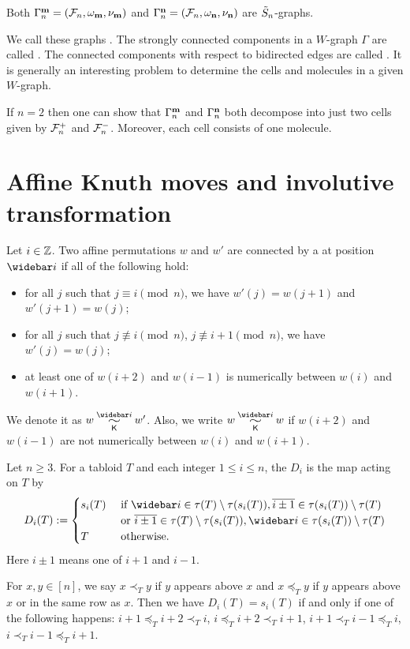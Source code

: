 \documentclass[11pt]{article}
\begin{document}
\begin{corollary}
Both $\Gamma^{\mathbf{m}}_n=(\mathcal F_n,\omega_{\mathbf{m}},\nu_{\mathbf{m}})$ and $\Gamma^{\mathbf{n}}_n=(\mathcal F_n,\omega_{\mathbf{n}},\nu_{\mathbf{n}})$ are $\tilde S_n$-graphs.
\end{corollary}
We call these graphs . The strongly connected components in a $W$-graph $\Gamma$ are called . The connected components with respect to bidirected edges are called . It is generally an interesting problem to determine the cells and molecules in a given $W$-graph.

If $n=2$ then one can show that
$\Gamma^{\mathbf{m}}_n$ and $\Gamma^{\mathbf{n}}_n$ both decompose into just two cells given by $\mathcal F_n^+$ and $\mathcal F_n^-$. Moreover, each cell consists of one molecule.




\section{Affine Knuth moves and involutive transformation}\label{Knuth-sect}

\begin{definition}
Let $i\in\mathbb{Z}$. Two affine permutations $w$ and $w'$ are connected by a  at position $\widebar i$ if all of the following hold:
\begin{itemize}
\item for all $j$ such that $j\equiv i\pmod{n}$, we have $w'(j)=w(j+1)$ and $w'(j+1)=w(j)$;
\item for all $j$ such that $j\not\equiv i\pmod{n}$, $j\not\equiv i+1\pmod{n}$, we have $w'(j)=w(j)$;
\item at least one of $w(i+2)$ and $w(i-1)$ is numerically between $w(i)$ and $w(i+1)$.
\end{itemize}
\end{definition}


We denote it as $w\K{\widebar i}w'$. Also, we write $w\K{\widebar i}w$ if $w(i+2)$ and $w(i-1)$ are not numerically between $w(i)$ and $w(i+1)$.


\begin{definition}
Let $n\ge3$. For a tabloid $T$ and each integer $1\le i\le n$, the  $D_i$ is the map acting on $T$ by
\[
D_i(T) :=\begin{cases}
s_{i}(T) &\text{ if }\widebar i\in\tau(T)\setminus\tau(s_i(T)), \overline{i\pm1}\in\tau(s_i(T))\setminus\tau(T)\\
&\text{ or }\overline{i\pm1}\in\tau(T)\setminus\tau(s_i(T)), \widebar i\in\tau(s_i(T))\setminus\tau(T)\\
T &\text{ otherwise.}
\end{cases}
\]
Here $i\pm1$ means one of $i+1$ and $i-1$.
\end{definition}
For $x,y\in[n]$, we say $x\prec_T y$ if $y$ appears above $x$ and $x\preceq_T y$ if $y$ appears above $x$ or in the same row as $x$.
Then we have $D_i(T)=s_{i}(T)$ if and only if one of the following happens:
$i+1\preceq_Ti+2\prec_Ti$, $i\preceq_Ti+2\prec_Ti+1$, 
$i+1\prec_Ti-1\preceq_Ti$, $i\prec_Ti-1\preceq_Ti+1$.
\end{document}
